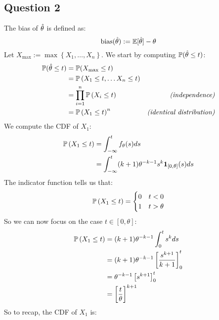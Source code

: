 \documentclass[12pt]{article}
\begin{document}
\subsection{Question 2}
The bias of \(\thetahat\) is defined as:
\begin{equation*}
    \bias(\thetahat) := \E[\thetahat] - \theta
\end{equation*}
Let \(X_{\max} := \max\left\{X_1, \ldots, X_n\right\}\). We start by computing \(\P(\thetahat \leq t)\):
\begin{align*}
    \P(\thetahat \leq t)
     & = \P(X_{\max} \leq t)                                                                \\
     & = \P\left(X_{1} \leq t, \ldots X_n \leq t\right)                                     \\
     & = \prod_{i=1}^n \P\left(X_{i} \leq t\right)      & \textit{(independence)}           \\
     & = \P\left(X_{1} \leq t\right)^n                  & \textit{(identical distribution)} \\
\end{align*}
We compute the CDF of \(X_1\):
\begin{align*}
    \P\left(X_{1} \leq t\right)
     & = \int_{-\infty}^t f_{   \theta}(s) ds                             \\
     & = \int_{-\infty}^t (k+1) \theta^{-k-1} s^k \1_{[0, \theta]} (s) ds \\
\end{align*}
The indicator function tells us that:
\begin{equation*}
    \P\left(X_{1} \leq t\right) =
    \begin{cases}
        0 & t < 0      \\
        1 & t > \theta
    \end{cases}
\end{equation*}
So we can now focus on the case \(t \in [0, \theta]\):
\begin{align*}
    \P\left(X_{1} \leq t\right)
     & = (k+1) \theta^{-k-1} \int_{0}^t s^k ds                      \\
     & = (k+1) \theta^{-k-1} \left[\frac{s^{k+1}}{k+1}\right]_{0}^t \\
     & = \theta^{-k-1} \left[s^{k+1}\right]_{0}^t                   \\
     & = \left[\frac{t}{\theta}\right]^{k+1}                        \\
\end{align*}
So to recap, the CDF of \(X_1\) is:
\end{document}
